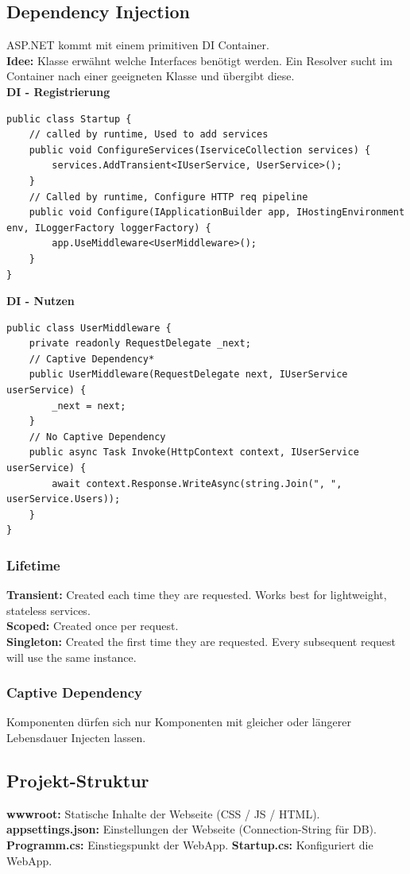 \subsection{Dependency Injection}
ASP.NET kommt mit einem primitiven DI Container.\\
\textbf{Idee:} Klasse erwähnt welche Interfaces benötigt werden.
Ein Resolver sucht im Container nach einer geeigneten Klasse und übergibt diese.\\
\textbf{DI - Registrierung}
\begin{lstlisting}
public class Startup {
    // called by runtime, Used to add services
    public void ConfigureServices(IserviceCollection services) {
        services.AddTransient<IUserService, UserService>();
    }
    // Called by runtime, Configure HTTP req pipeline
    public void Configure(IApplicationBuilder app, IHostingEnvironment env, ILoggerFactory loggerFactory) {
        app.UseMiddleware<UserMiddleware>();
    }
}
\end{lstlisting}
\textbf{DI - Nutzen}
\begin{lstlisting}
public class UserMiddleware {
    private readonly RequestDelegate _next;
    // Captive Dependency*
    public UserMiddleware(RequestDelegate next, IUserService userService) {
        _next = next;
    }
    // No Captive Dependency
    public async Task Invoke(HttpContext context, IUserService userService) {
        await context.Response.WriteAsync(string.Join(", ", userService.Users));
    }
}
\end{lstlisting}
\subsubsection{Lifetime}
\textbf{Transient:} Created each time they are requested.
Works best for lightweight, stateless services.\\
\textbf{Scoped:} Created once per request.\\
\textbf{Singleton:} Created the first time they are requested.
Every subsequent request will use the same instance.\\
\subsubsection{Captive Dependency}
Komponenten dürfen sich nur Komponenten mit gleicher oder längerer Lebensdauer Injecten lassen.

\subsection{Projekt-Struktur}
\textbf{wwwroot:} Statische Inhalte der Webseite (CSS / JS / HTML).
\textbf{appsettings.json:} Einstellungen der Webseite (Connection-String für DB).
\textbf{Programm.cs:} Einstiegspunkt der WebApp.
\textbf{Startup.cs:} Konfiguriert die WebApp.

